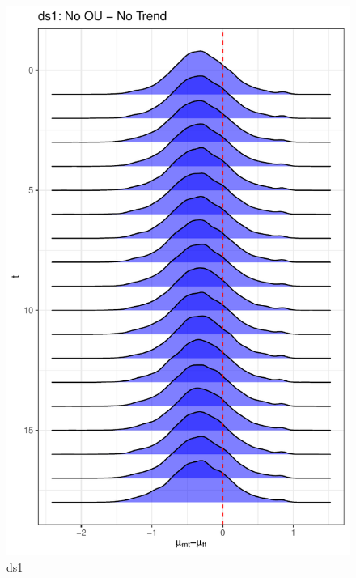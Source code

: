 \documentclass[
  12pt,
]{article}
\begin{document}
\begin{figure}

{\centering \includegraphics[width=0.9\linewidth]{../Figures/ds1/mu_diff} 

}

\caption{ds1}\label{fig:unnamed-chunk-7}
\end{figure}
\end{document}
